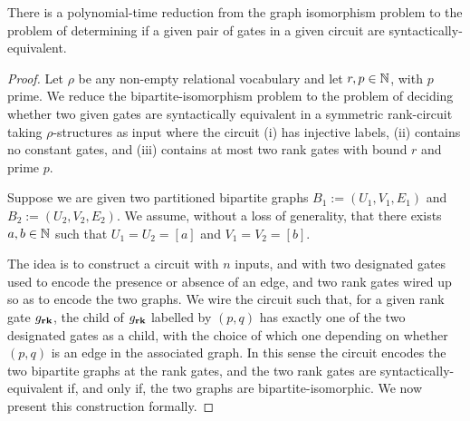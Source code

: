 \documentclass[../paper.tex]{subfiles}
\begin{document}
\begin{prop}
   There is a polynomial-time reduction from the graph isomorphism problem to the
  problem of determining if a given pair of gates in a given circuit are
  syntactically-equivalent.
  \label{prop:syntactic-graph-iso}
\end{prop}
\begin{proof}
 Let $\rho$ be any non-empty relational vocabulary and let $r, p \in \mathbb{N}$,
  with $p$ prime.  We reduce the bipartite-isomorphism problem to the
  problem of deciding whether two given gates are syntactically
  equivalent in a symmetric rank-circuit taking $\rho$-structures as
  input where the circuit (i) has
  injective labels, (ii) contains no constant gates, and (iii) contains at most
  two rank gates with bound $r$ and prime $p$.

  Suppose we are given two partitioned bipartite graphs $B_1 := (U_1, V_1, E_1)$
  and $B_2 := (U_2, V_2, E_2)$. We assume, without a loss of generality, that
  there exists $a, b \in \mathbb{N}$ such that $U_1 = U_2 = [a]$ and $V_1 = V_2 =
  [b]$.

  The idea is to construct a circuit with $n$ inputs, and with two designated
  gates used to encode the presence or absence of an edge, and two rank gates
  wired up so as to encode the two graphs. We wire the circuit such that, for a
  given rank gate $g_{\text{\textbf{rk}}}$, the child of $g_{\text{\textbf{rk}}}$ labelled by $(p,q)$ has
  exactly one of the two designated gates as a child, with the choice of which
  one depending on whether $(p,q)$ is an edge in the associated graph. In this
  sense the circuit encodes the two bipartite graphs at the rank gates, and the
  two rank gates are syntactically-equivalent if, and only if, the two graphs
  are bipartite-isomorphic. We now present this construction formally.


\end{proof}
\end{document}

